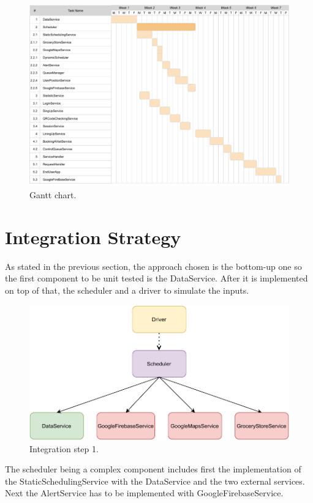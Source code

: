 \begin{figure}[H]
    \centering
    \includegraphics[width=1.0\textwidth]{images/Gantt.pdf}
    \caption{Gantt chart.}
\end{figure}

\section{Integration Strategy}

As stated in the previous section, the approach chosen is the bottom-up one so the first component to be unit tested is the DataService. After it is implemented on top of that, the scheduler and a driver to simulate the inputs.

\begin{figure}[H]
    \centering
    \includegraphics[width=1.0\textwidth]{images/component1.pdf}
    \caption{Integration step 1.}
\end{figure}

The scheduler being a complex component includes first the implementation of the StaticSchedulingService with the DataService and the two external services. Next the AlertService has to be implemented with GoogleFirebaseService.

